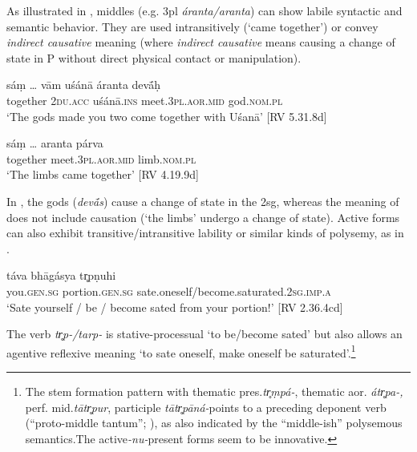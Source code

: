 \documentclass[output=paper]{langscibook}
\begin{document}
{As illustrated in , middles (e.g. 3pl \textit{áranta/aranta}) can show labile syntactic and semantic behavior. They are used intransitively (‘came together’) or convey \textit{indirect causative} meaning (where \textit{indirect causative} means causing a change of state in P without direct physical contact or manipulation).}

\ea%
    \label{ex:Orqueda:9}
\ea  
    \label{ex:Orqueda:9a}
    \gll sáṃ …  vām  uśánā  áranta  dev\'{ā}ḥ\\
    together { } 2\textsc{du.acc}  uśánā.\textsc{ins}  meet.3\textsc{pl.aor.mid}  god.\textsc{nom.pl}\\
\glt    ‘The gods made you two come together with Uśanā’ [RV 5.31.8d]

\ex
     \label{ex:Orqueda:9b}
\gll sáṃ …  aranta  párva\\
    together { } meet.\textsc{3pl.aor.mid} limb.\textsc{nom.pl}\\
\glt ‘The limbs came together’ [RV 4.19.9d]
    \z
    \z

{In , the gods (\textit{dev\'{ā}s}) cause a change of state in the 2sg, whereas the meaning of  does not include causation (‘the limbs’ undergo a change of state). Active forms can also exhibit transitive/intransitive lability or similar kinds of polysemy, as in .}

\ea%
    \label{ex:Orqueda:10}
\gll táva  bhāgásya  tr̥pṇuhi\\
  you.\textsc{gen.sg}  portion.\textsc{gen.sg}  sate.oneself/become.saturated.\textsc{2sg.imp.a}\\
\glt ‘Sate yourself / be / become sated from your portion!’ [RV 2.36.4cd]
\z

{The verb \textit{tr̥p-/tarp-} is stative-processual ‘to be/become sated’ but also allows an agentive reflexive meaning ‘to sate oneself, make oneself be saturated’.}\footnote{{{The stem formation pattern with thematic pres.}{\textit{tr̥ṃpá-}}{, thematic aor.}{ \textit{átr̥pa-,} }{perf. mid.}{\textit{tātr̥pur}}{, participle}{ \textit{tātr̥pāná-}}{points to a preceding deponent verb (“proto-middle tantum”; \citealt{Pooth2014}), as also indicated by the “middle-ish” polysemous semantics.}{The active}{\textit{{}-nu-}}{present forms seem to be innovative.}}}{}
\end{document}
